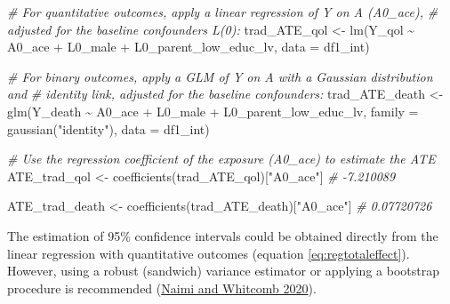 \documentclass[
]{book}
\newenvironment{Shaded}{\begin{snugshade}}{\end{snugshade}}
\newcommand{\AttributeTok}[1]{\textcolor[rgb]{0.77,0.63,0.00}{#1}}
\newcommand{\CommentTok}[1]{\textcolor[rgb]{0.56,0.35,0.01}{\textit{#1}}}
\newcommand{\FunctionTok}[1]{\textcolor[rgb]{0.00,0.00,0.00}{#1}}
\newcommand{\NormalTok}[1]{#1}
\newcommand{\OtherTok}[1]{\textcolor[rgb]{0.56,0.35,0.01}{#1}}
\newcommand{\SpecialCharTok}[1]{\textcolor[rgb]{0.00,0.00,0.00}{#1}}
\newcommand{\StringTok}[1]{\textcolor[rgb]{0.31,0.60,0.02}{#1}}
\begin{document}
\begin{Shaded}
\begin{Highlighting}[]
\CommentTok{\# For quantitative outcomes, apply a linear regression of Y on A (A0\_ace), }
\CommentTok{\# adjusted for the baseline confounders L(0):}
\NormalTok{trad\_ATE\_qol }\OtherTok{\textless{}{-}} \FunctionTok{lm}\NormalTok{(Y\_qol }\SpecialCharTok{\textasciitilde{}}\NormalTok{ A0\_ace }\SpecialCharTok{+}\NormalTok{ L0\_male }\SpecialCharTok{+}\NormalTok{ L0\_parent\_low\_educ\_lv,}
                   \AttributeTok{data =}\NormalTok{ df1\_int)}

\CommentTok{\# For binary outcomes, apply a GLM of Y on A with a Gaussian distribution and}
\CommentTok{\# identity link, adjusted for the baseline confounders:}
\NormalTok{trad\_ATE\_death }\OtherTok{\textless{}{-}} \FunctionTok{glm}\NormalTok{(Y\_death }\SpecialCharTok{\textasciitilde{}}\NormalTok{ A0\_ace }\SpecialCharTok{+}\NormalTok{ L0\_male }\SpecialCharTok{+}\NormalTok{ L0\_parent\_low\_educ\_lv,}
                      \AttributeTok{family =} \FunctionTok{gaussian}\NormalTok{(}\StringTok{"identity"}\NormalTok{),}
                      \AttributeTok{data =}\NormalTok{ df1\_int)}

\CommentTok{\# Use the regression coefficient of the exposure (A0\_ace) to estimate the ATE}
\NormalTok{ATE\_trad\_qol }\OtherTok{\textless{}{-}} \FunctionTok{coefficients}\NormalTok{(trad\_ATE\_qol)[}\StringTok{"A0\_ace"}\NormalTok{]}
\CommentTok{\# {-}7.210089}

\NormalTok{ATE\_trad\_death }\OtherTok{\textless{}{-}} \FunctionTok{coefficients}\NormalTok{(trad\_ATE\_death)[}\StringTok{"A0\_ace"}\NormalTok{]}
\CommentTok{\# 0.07720726}
\end{Highlighting}
\end{Shaded}

The estimation of 95\% confidence intervals could be obtained directly from the linear regression with quantitative outcomes (equation \eqref{eq:regtotaleffect}). However, using a robust (sandwich) variance estimator or applying a bootstrap procedure is recommended (\protect\hyperlink{ref-naimi2020}{Naimi and Whitcomb 2020}).
\end{document}
